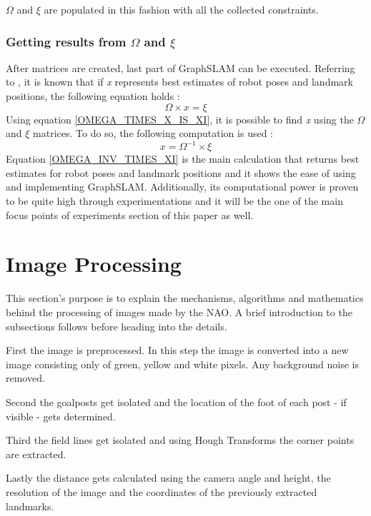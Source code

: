 \documentclass{ba-kecs}
\numberwithin{figure}{section}
\numberwithin{equation}{section}
\begin{document}
	$\Omega$ and $\xi$ are populated in this fashion with all the collected constraints.
	
\subsubsection{Getting results from $\Omega$ and $\xi$}
	After matrices are created, last part of GraphSLAM can be executed. Referring to \cite{sik2}, it is known that if \textit{x} represents best estimates of robot poses and landmark positions, the following equation holds :
	\begin{equation}
	\Omega \times x = \xi \label{OMEGA_TIMES_X_IS_XI}
	\end{equation}
	Using equation \eqref{OMEGA_TIMES_X_IS_XI}, it is possible to find \textit{x} using the $\Omega$ and $\xi$ matrices. To do so, the following computation is used :
	\begin{equation}
	x = \Omega^{-1} \times \xi \label{OMEGA_INV_TIMES_XI}
	\end{equation}
	Equation \eqref{OMEGA_INV_TIMES_XI} is the main calculation that returns best estimates for robot poses and landmark positions and it shows the ease of using and implementing GraphSLAM. Additionally, its computational power is proven to be quite high through experimentations\cite{sik,sik2} and it will be the one of the main focus points of experiments section of this paper as well.


\section{Image Processing}

This section's purpose is to explain the mechanisms, algorithms and mathematics behind the processing of images made by the NAO.
A brief introduction to the subsections follows before heading into the details.

First the image is preprocessed. In this step the image is converted into a new image consisting only of green, yellow and white pixels. Any background noise is removed.

Second the goalposts get isolated and the location of the foot of each post - if visible - gets determined.

Third the field lines get isolated and using Hough Transforms the corner points are extracted.

Lastly the distance gets calculated using the camera angle and height, the resolution of the image and the coordinates of the previously extracted landmarks.
\end{document}
